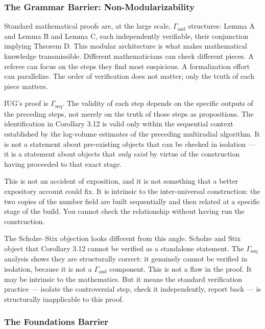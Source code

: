 \documentclass[10pt,a4paper]{article}
\begin{document}
\subsubsection{The Grammar Barrier: Non-Modularizability}

Standard mathematical proofs are, at the large scale, $\Gamma_\text{and}$ structures:
Lemma A and Lemma B and Lemma C, each independently verifiable, their conjunction implying
Theorem D.
This modular architecture is what makes mathematical knowledge transmissible.
Different mathematicians can check different pieces.
A referee can focus on the steps they find most suspicious.
A formalization effort can parallelize.
The order of verification does not matter; only the truth of each piece matters.

IUG's proof is $\Gamma_\text{seq}$.
The validity of each step depends on the specific outputs of the preceding steps,
not merely on the truth of those steps as propositions.
The identification in Corollary 3.12 is valid only within the sequential context established
by the log-volume estimates of the preceding multiradial algorithm.
It is not a statement about pre-existing objects that can be checked in isolation ---
it is a statement about objects that \emph{only exist} by virtue of the construction having
proceeded to that exact stage.

This is not an accident of exposition, and it is not something that a better expository
account could fix.
It is intrinsic to the inter-universal construction: the two copies of the number field are
built sequentially and then related at a specific stage of the build.
You cannot check the relationship without having run the construction.

The Scholze--Stix objection looks different from this angle.
Scholze and Stix object that Corollary 3.12 cannot be verified as a standalone statement.
The $\Gamma_\text{seq}$ analysis shows they are structurally correct: it genuinely cannot be
verified in isolation, because it is not a $\Gamma_\text{and}$ component.
This is not a flaw in the proof.
It may be intrinsic to the mathematics.
But it means the standard verification practice --- isolate the controversial step, check it
independently, report back --- is structurally inapplicable to this proof.

\subsubsection{The Foundations Barrier}
\end{document}
